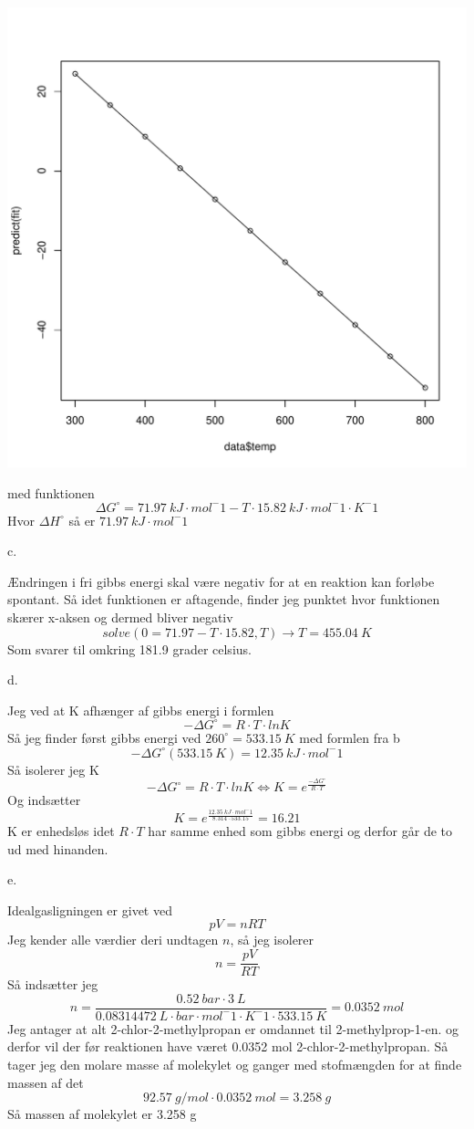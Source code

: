 \documentclass[12pt]{article}
\begin{document}
\includegraphics[width=\textwidth]{kemi1.pdf}

med funktionen
$$\Delta G^{\circ} = 71.97 \ kJ\cdot mol^-1 - T \cdot 15.82 \ kJ\cdot mol^-1 \cdot K^-1$$
Hvor $\Delta H^{\circ}$ så er $71.97 \ kJ\cdot mol^-1$

c.

Ændringen i fri gibbs energi skal være negativ for at en reaktion kan forløbe spontant.
Så idet funktionen er aftagende, finder jeg punktet hvor funktionen skærer x-aksen og dermed
bliver negativ
$$solve(0 = 71.97-T\cdot 15.82,T) \rightarrow T = 455.04 \ K$$
Som svarer til omkring 181.9 grader celsius.

d.

Jeg ved at K afhænger af gibbs energi i formlen
$$-\Delta G^{\circ} = R\cdot T\cdot ln K$$
Så jeg finder først gibbs energi ved $260^{\circ} = 533.15\ K$ med formlen fra b
$$-\Delta G^{\circ}(533.15\ K) = 12.35\ kJ\cdot mol^-1$$
Så isolerer jeg K
$$-\Delta G^{\circ} = R\cdot T\cdot ln K \Leftrightarrow K = e^{\frac{-\Delta G^{\circ}}{R\cdot T}}$$
Og indsætter
$$K = e^{\frac{12.35\ kJ\cdot mol^-1}{8.314\cdot 533.15}} = 16.21$$
K er enhedsløs idet $R\cdot T$ har samme enhed som gibbs energi og derfor går de to ud med hinanden.

e.

Idealgasligningen er givet ved
$$pV = nRT$$
Jeg kender alle værdier deri undtagen $n$, så jeg isolerer
$$n = \frac{pV}{RT}$$
Så indsætter jeg
$$n = \frac{0.52\ bar \cdot 3\ L}{0.08314472\ L\cdot bar\cdot mol^-1\cdot K^-1\cdot 533.15\ K} = 0.0352\ mol$$
Jeg antager at alt 2-chlor-2-methylpropan er omdannet til 2-methylprop-1-en. og derfor vil der før reaktionen have været 0.0352 mol
2-chlor-2-methylpropan. Så tager jeg den molare masse af molekylet og ganger med stofmængden for at finde massen af det
$$92.57\ g/mol \cdot 0.0352\ mol = 3.258\ g$$
Så massen af molekylet er 3.258 g
\end{document}
